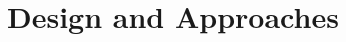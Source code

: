 \documentclass[Dissertation.tex]{subfiles}
\begin{document}
\chapter{Design and Approaches}
\end{document}
